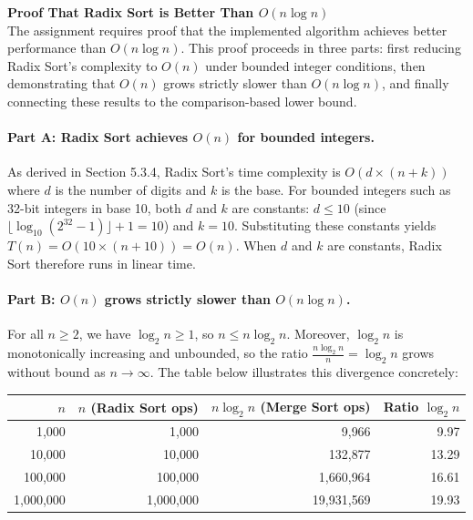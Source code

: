 \documentclass[12pt]{article}
\begin{document}
\newpage
\noindent\textbf{Proof That Radix Sort is Better Than $O(n \log n)$}\\

The assignment requires proof that the implemented algorithm achieves better performance than $O(n \log n)$. This proof proceeds in three parts: first reducing Radix Sort's complexity to $O(n)$ under bounded integer conditions, then demonstrating that $O(n)$ grows strictly slower than $O(n \log n)$, and finally connecting these results to the comparison-based lower bound.

\noindent\paragraph{Part A: Radix Sort achieves $O(n)$ for bounded integers.}
As derived in Section 5.3.4, Radix Sort's time complexity is $O(d \times (n + k))$ where $d$ is the number of digits and $k$ is the base. For bounded integers such as 32-bit integers in base 10, both $d$ and $k$ are constants: $d \leq 10$ (since $\lfloor \log_{10}(2^{32} - 1) \rfloor + 1 = 10$) and $k = 10$. Substituting these constants yields $T(n) = O(10 \times (n + 10)) = O(n)$. When $d$ and $k$ are constants, Radix Sort therefore runs in linear time.

\noindent\paragraph{Part B: $O(n)$ grows strictly slower than $O(n \log n)$.}
For all $n \geq 2$, we have $\log_2 n \geq 1$, so $n \leq n \log_2 n$. Moreover, $\log_2 n$ is monotonically increasing and unbounded, so the ratio $\frac{n \log_2 n}{n} = \log_2 n$ grows without bound as $n \to \infty$. The table below illustrates this divergence concretely: 

\begin{table}[h]
\centering
\begin{tabular}{@{}rrrr@{}}
\toprule
$n$ & $n$ (Radix Sort ops) & $n \log_2 n$ (Merge Sort ops) & Ratio $\log_2 n$ \\
\midrule
1{,}000 & 1{,}000 & 9{,}966 & 9.97 \\
10{,}000 & 10{,}000 & 132{,}877 & 13.29 \\
100{,}000 & 100{,}000 & 1{,}660{,}964 & 16.61 \\
1{,}000{,}000 & 1{,}000{,}000 & 19{,}931{,}569 & 19.93 \\
\bottomrule
\end{tabular}
\end{table}
\end{document}
